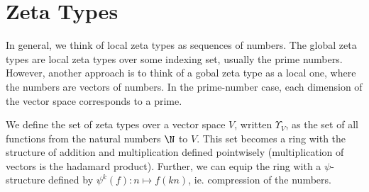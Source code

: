 \section{Zeta Types}

In general, we think of local zeta types as sequences of numbers. The global zeta types are local zeta types over some indexing set, usually the prime numbers. However, another approach is to think of a gobal zeta type as a local one, where the numbers are vectors of numbers. In the prime-number case, each dimension of the vector space corresponds to a prime. 

\begin{propdef}
  We define the set of zeta types over a vector space $V$, written $\Upsilon_V$, as the set of all functions from the natural numbers $\N$ to $V$. This set becomes a ring with the structure of addition and multiplication defined pointwisely (multiplication of vectors is the hadamard product). Further, we can equip the ring with a $\psi$-structure defined by $\psi^k(f) : n \mapsto f(kn)$, ie. compression of the numbers. 
\end{propdef}
